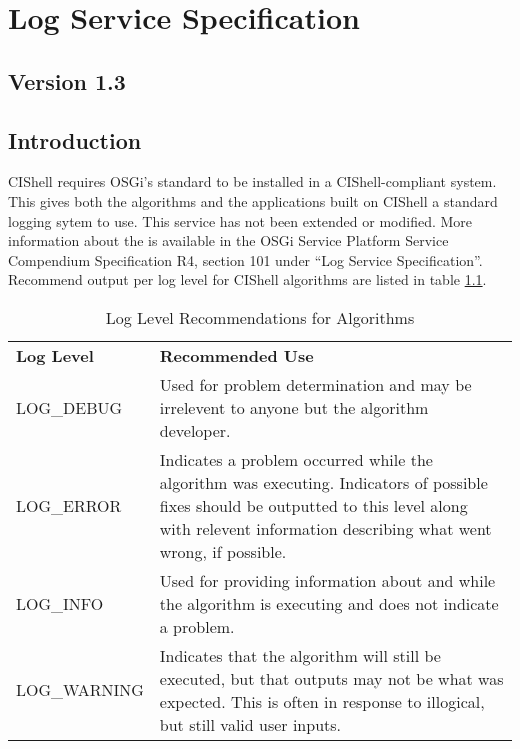 \chapter{Log Service Specification}
\label{logService}
\section*{Version 1.3}
\section{Introduction}

CIShell requires OSGi's standard  to be installed in a
CIShell-compliant system. This gives both the algorithms and the applications
built on CIShell a standard logging sytem to use. This service has not been
extended or modified. More information about the  is available
in the OSGi Service Platform Service Compendium Specification R4, section 101
under ``Log Service Specification''. Recommend output per log level for CIShell
algorithms are listed in table \ref{table:logLevels}.

\begin{table}[htb!]
\begin{center}
\begin{tabular}{l p{12cm}}
\textbf{Log Level} & \textbf{Recommended Use} \\
LOG\_DEBUG & Used for problem determination and may be irrelevent to anyone but
the algorithm developer. \\
LOG\_ERROR & Indicates a problem occurred while the algorithm was executing.
Indicators of possible fixes should be outputted to this level along with
relevent information describing what went wrong, if possible. \\
LOG\_INFO & Used for providing information about and while the algorithm is
executing and does not indicate a problem. \\
LOG\_WARNING & Indicates that the algorithm will still be executed, but
that outputs may not be what was expected. This is often in response to
illogical, but still valid user inputs.
\end{tabular}
\end{center}
\caption{Log Level Recommendations for Algorithms}
\label{table:logLevels}
\end{table}